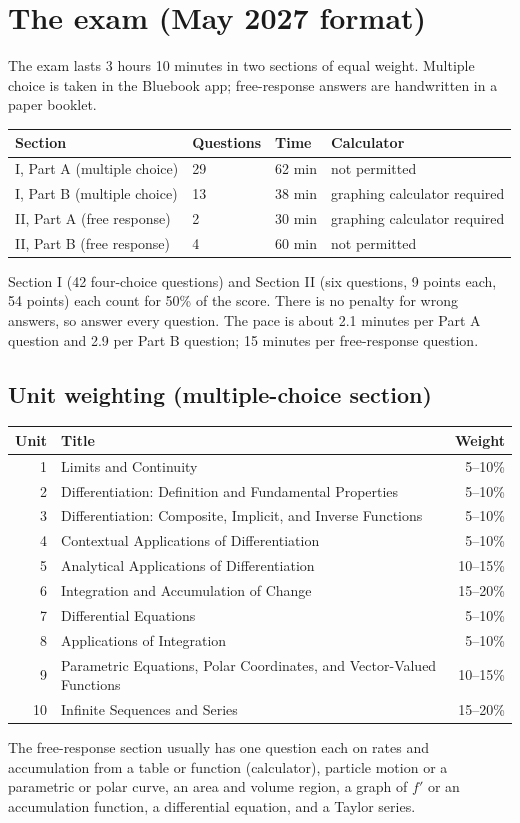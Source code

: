 \documentclass{apcalc}
\begin{document}
\section{The exam (May 2027 format)}
The exam lasts 3 hours 10 minutes in two sections of equal weight. Multiple choice is taken in the Bluebook app; free-response answers are handwritten in a paper booklet.
\begin{center}\small
\begin{tabular}{@{}llll@{}}\toprule
Section & Questions & Time & Calculator\\\midrule
I, Part A (multiple choice) & 29 & 62 min & not permitted\\
I, Part B (multiple choice) & 13 & 38 min & graphing calculator required\\
II, Part A (free response) & 2 & 30 min & graphing calculator required\\
II, Part B (free response) & 4 & 60 min & not permitted\\\bottomrule
\end{tabular}
\end{center}
Section I (42 four-choice questions) and Section II (six questions, 9 points each, 54 points) each count for 50\% of the score. There is no penalty for wrong answers, so answer every question. The pace is about 2.1 minutes per Part A question and 2.9 per Part B question; 15 minutes per free-response question.

\subsection*{Unit weighting (multiple-choice section)}
\begin{center}\small
\begin{tabular}{@{}rlr@{}}\toprule
Unit & Title & Weight\\\midrule
1 & Limits and Continuity & 5--10\%\\
2 & Differentiation: Definition and Fundamental Properties & 5--10\%\\
3 & Differentiation: Composite, Implicit, and Inverse Functions & 5--10\%\\
4 & Contextual Applications of Differentiation & 5--10\%\\
5 & Analytical Applications of Differentiation & 10--15\%\\
6 & Integration and Accumulation of Change & 15--20\%\\
7 & Differential Equations & 5--10\%\\
8 & Applications of Integration & 5--10\%\\
9 & Parametric Equations, Polar Coordinates, and Vector-Valued Functions & 10--15\%\\
10 & Infinite Sequences and Series & 15--20\%\\\bottomrule
\end{tabular}
\end{center}
The free-response section usually has one question each on rates and accumulation from a table or function (calculator), particle motion or a parametric or polar curve, an area and volume region, a graph of $f'$ or an accumulation function, a differential equation, and a Taylor series.
\end{document}
